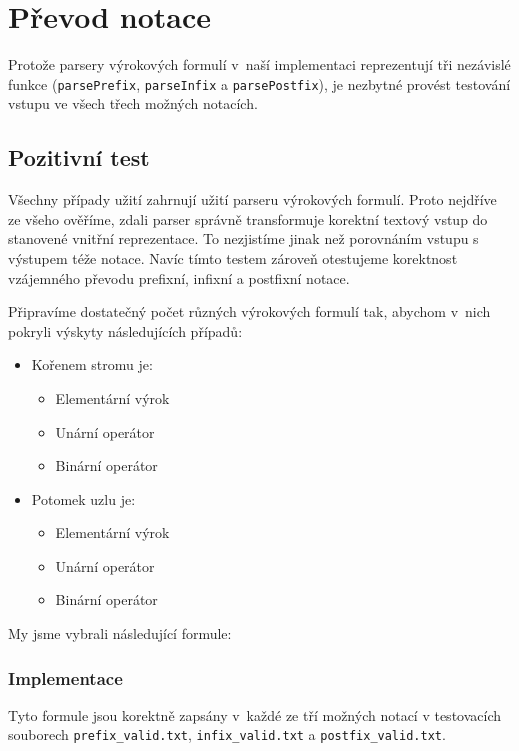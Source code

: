 \documentclass[thesis=B,czech,hidelinks]{thesis}[2012/06/26]
\begin{document}
\section{Převod notace}

Protože parsery výrokových formulí v~naší implementaci reprezentují tři nezávislé funkce (\texttt{parsePrefix}, \texttt{parseInfix} a \texttt{parsePostfix}), je nezbytné provést testování vstupu ve všech třech možných notacích. 

\subsection{Pozitivní test}

Všechny případy užití zahrnují užití parseru výrokových formulí. Proto nejdříve ze všeho ověříme, zdali parser správně transformuje korektní textový vstup do stanovené vnitřní reprezentace. To nezjistíme jinak než porovnáním vstupu s výstupem téže notace. Navíc tímto testem zároveň otestujeme korektnost vzájemného převodu prefixní, infixní a postfixní notace.

Připravíme dostatečný počet různých výrokových formulí tak, abychom v~nich pokryli výskyty následujících případů:

\begin{itemize}
	\item Kořenem stromu je:
	\begin{itemize}
		\item Elementární výrok
		\item Unární operátor
		\item Binární operátor
	\end{itemize}
	\item Potomek uzlu je:
	\begin{itemize}
		\item Elementární výrok
		\item Unární operátor
		\item Binární operátor
	\end{itemize}
\end{itemize}

My jsme vybrali následující formule:



\subsubsection{Implementace}

Tyto formule jsou korektně zapsány v~každé ze tří možných notací v testovacích souborech \texttt{prefix\_valid.txt}, \texttt{infix\_valid.txt} a \texttt{postfix\_valid.txt}.
\end{document}
